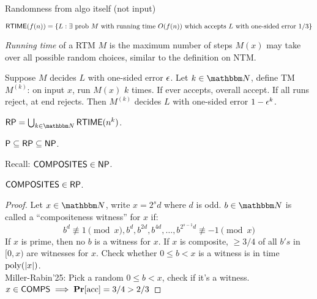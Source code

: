 \documentclass{article}
\begin{document}

Randomness from algo itself (not input)

\begin{definition}
  \[ \text{\sf RTIME}(f(n)) = \lbrace L : \text{\(\exists\) prob \(M\) with running time \(O(f(n))\) which accepts \(L\) with one-sided error \(1/3\)}\rbrace \]
\end{definition}

\begin{definition}
  {\it Running time} of a RTM \(M\) is the maximum number of steps \(M(x)\) may take over all possible random choices, similar to the definition on NTM.
\end{definition}

\begin{lemma}
  Suppose \(M\) decides \(L\) with one-sided error \(\epsilon\). Let \(k \in \N\), define TM \(M^{(k)}\): on input \(x\), run \(M(x)\) \(k\) times. If ever accepts, overall accept. If all runs reject, at end rejects. Then \(M^{(k)}\) decides \(L\) with one-sided error \(1-\epsilon^k\).
\end{lemma}

\begin{definition}
  \( \RP = \bigcup_{k \in \N} \RTIME(n^k) \).
\end{definition}

\begin{proposition}
  \( \text{\sf P} \subseteq \text{\sf RP} \subseteq \text{\sf NP} \).
\end{proposition}

Recall: \( \text{\sf COMPOSITES} \in \text{\sf NP} \).

\begin{theorem}['74]
  \( \text{\sf COMPOSITES} \in \text{\sf RP} \).
\end{theorem}

\begin{proof}
  Let \(x \in \N\), write \(x = 2^s d\) where \(d\) is odd. \(b \in \N\) is called a ``compositeness witness'' for \(x\) if:
  \[ b^d \not\equiv 1 \pmod{x}, b^d, b^{2d}, b^{4d}, \ldots, b^{2^{s-1}d} \not\equiv -1 \pmod{x}\]
  If \(x\) is prime, then no \(b\) is a witness for \(x\). If \(x\) is composite, \(\geq 3/4\) of all \(b's\) in \([0, x)\) are witnesses for \(x\). Check whether \(0 \leq b < x\) is a witness is in time \(\operatorname{poly}(|x|)\). \\
  Miller-Rabin'25: Pick a random \(0 \leq b < x\), check if it's a witness. \(x \in \text{\sf COMPS} \implies \mathop{\bf Pr\/}\lbrack\text{acc}\rbrack = 3/4 > 2/3\)
\end{proof}
\end{document}
